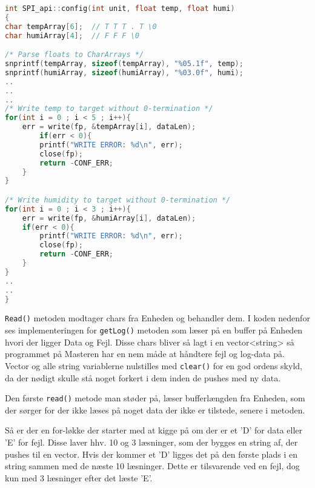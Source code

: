 \begin{lstlisting}[language=C]
int SPI_api::config(int unit, float temp, float humi)
{
char tempArray[6];	// T T T . T \0
char humiArray[4];	// F F F \0

/* Parse floats to CharArrays */
snprintf(tempArray, sizeof(tempArray), "%05.1f", temp);
snprintf(humiArray, sizeof(humiArray), "%03.0f", humi);
..
..
..
/* Write temp to target without 0-termination */
for(int i = 0 ; i < 5 ; i++){
	err = write(fp, &tempArray[i], dataLen);
		if(err < 0){
		printf("WRITE ERROR: %d\n", err);
		close(fp);
		return -CONF_ERR;
	}
}

/* Write humidity to target without 0-termination */	
for(int i = 0 ; i < 3 ; i++){		
	err = write(fp, &humiArray[i], dataLen);
	if(err < 0){
		printf("WRITE ERROR: %d\n", err);
		close(fp);
		return -CONF_ERR;
	}
}
..
..
}
\end{lstlisting}

\verb+Read()+ metoden modtager chars fra Enheden og behandler dem. I koden nedenfor ses implementeringen for \verb+getLog()+ metoden som læser på en buffer på Enheden hvori der ligger Data og Fejl. Disse chars bliver så lagt i en vector<string> så programmet på Masteren har en nem måde at håndtere fejl og log-data på. Vector og alle string variablerne nulstilles med \verb+clear()+ for en god ordens skyld, da der nødigt skulle stå noget forkert i dem inden de pushes med ny data.

Den første \verb+read()+ metode man støder på, læser bufferlængden fra Enheden, som der sørger for der ikke læses på noget data der ikke er tilstede, senere i metoden.

Så er der en for-løkke der starter med at kigge på om der er et 'D' for data eller 'E' for fejl. Disse laver hhv. 10 og 3 læsninger, som der bygges en string af, der pushes til en vector. Hvis der kommer et 'D' ligges det på den første plads i en string sammen med de næste 10 læsninger. Dette er tilsvarende ved en fejl, dog kun med 3 læsninger efter det læste 'E'.

